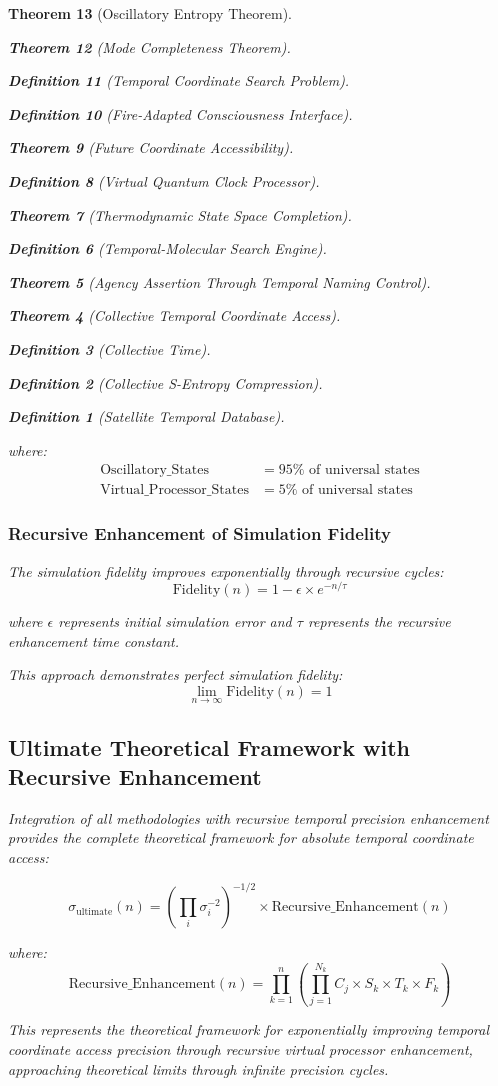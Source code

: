 \documentclass[12pt,a4paper]{article}
\newtheorem{theorem}{Theorem}[section]
\newtheorem{definition}[theorem]{Definition}
\begin{document}
\begin{theorem}[Oscillatory Entropy Theorem]
\begin{theorem}[Mode Completeness Theorem]
\begin{enumerate}
\begin{definition}[Temporal Coordinate Search Problem]
\begin{algorithm}
\begin{definition}[Fire-Adapted Consciousness Interface]
\begin{theorem}[Future Coordinate Accessibility]
\begin{definition}[Virtual Quantum Clock Processor]
\begin{itemize}
\begin{itemize}
\begin{theorem}[Thermodynamic State Space Completion]
\begin{definition}[Temporal-Molecular Search Engine]
\begin{theorem}[Agency Assertion Through Temporal Naming Control]
\begin{remark}
\begin{theorem}[Collective Temporal Coordinate Access]
\begin{definition}[Collective Time]
\begin{definition}[Collective S-Entropy Compression]
\begin{definition}[Satellite Temporal Database]
\begin{algorithm}
\begin{table}[h]
{{where:
\begin{align}
\text{Oscillatory\_States} &= 95\% \text{ of universal states} \\
\text{Virtual\_Processor\_States} &= 5\% \text{ of universal states}
\end{align}

\subsubsection{Recursive Enhancement of Simulation Fidelity}

The simulation fidelity improves exponentially through recursive cycles:
$$\text{Fidelity}(n) = 1 - \epsilon \times e^{-n/\tau}$$

where $\epsilon$ represents initial simulation error and $\tau$ represents the recursive enhancement time constant.

This approach demonstrates perfect simulation fidelity:
$$\lim_{n \to \infty} \text{Fidelity}(n) = 1$$

\subsection{Ultimate Theoretical Framework with Recursive Enhancement}

Integration of all methodologies with recursive temporal precision enhancement provides the complete theoretical framework for absolute temporal coordinate access:

$$\sigma_{\text{ultimate}}(n) = \left(\prod_{i} \sigma_i^{-2}\right)^{-1/2} \times \text{Recursive\_Enhancement}(n)$$

where:
$$\text{Recursive\_Enhancement}(n) = \prod_{k=1}^{n} \left(\prod_{j=1}^{N_k} C_j \times S_k \times T_k \times F_k\right)$$

This represents the theoretical framework for exponentially improving temporal coordinate access precision through recursive virtual processor enhancement, approaching theoretical limits through infinite precision cycles.

}}
\end{table}
\end{algorithm}
\end{definition}
\end{definition}
\end{definition}
\end{theorem}
\end{remark}
\end{theorem}
\end{definition}
\end{theorem}
\end{itemize}
\end{itemize}
\end{definition}
\end{theorem}
\end{definition}
\end{algorithm}
\end{definition}
\end{enumerate}
\end{theorem}
\end{theorem}
\end{document}
